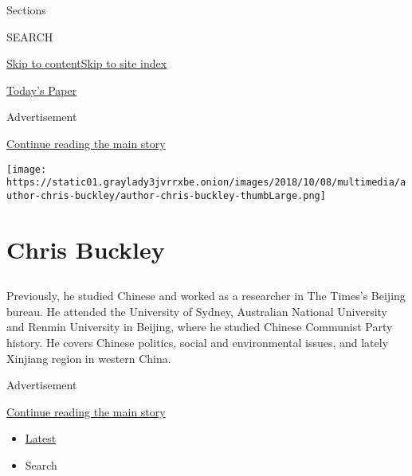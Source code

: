 Sections

SEARCH

\protect\hyperlink{site-content}{Skip to
content}\protect\hyperlink{site-index}{Skip to site index}

\href{https://myaccount.nytimes3xbfgragh.onion/auth/login?response_type=cookie\&client_id=vi}{}

\href{https://www.nytimes3xbfgragh.onion/section/todayspaper}{Today's
Paper}

Advertisement

\protect\hyperlink{after-top}{Continue reading the main story}

\texttt{[image: https://static01.graylady3jvrrxbe.onion/images/2018/10/08/multimedia/author-chris-buckley/author-chris-buckley-thumbLarge.png]}

\hypertarget{chris-buckley}{%
\section{Chris Buckley}\label{chris-buckley}}

\hypertarget{section}{%
\subsection{}\label{section}}

Previously, he studied Chinese and worked as a researcher in The Times's
Beijing bureau. He attended the University of Sydney, Australian
National University and Renmin University in Beijing, where he studied
Chinese Communist Party history. He covers Chinese politics, social and
environmental issues, and lately Xinjiang region in western China.

Advertisement

\protect\hyperlink{after-mid1}{Continue reading the main story}

\begin{itemize}
\tightlist
\item
  \protect\hyperlink{stream-panel}{Latest}
\item
  Search
\end{itemize}


